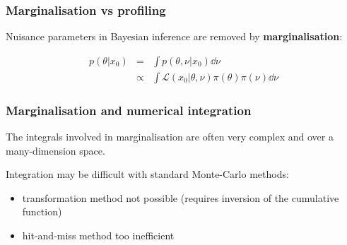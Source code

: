 \documentclass[9pt]{beamer}
\begin{document}
\begin{frame}
 \frametitle{Marginalisation vs profiling}
 
 Nuisance parameters in Bayesian inference are removed by \textbf{marginalisation}:
 
 \begin{eqnarray}
  p(\theta|x_0) & = & \int p(\theta,\nu|x_0) \dd\nu \nonumber \\
  & \propto & \int \mathcal{L}(x_0|\theta,\nu)\pi(\theta)\pi(\nu)\dd\nu \nonumber
 \end{eqnarray}
 
 
\end{frame}


\begin{frame}
 \frametitle{Marginalisation and numerical integration}
 
 The integrals involved in marginalisation are often very complex and over a many-dimension space.
 
 Integration may be difficult with standard Monte-Carlo methods:
 
 \begin{itemize}
  \item transformation method not possible (requires inversion of the cumulative function)
  \item hit-and-miss method too inefficient
 \end{itemize}

 
\end{frame}
\end{document}
